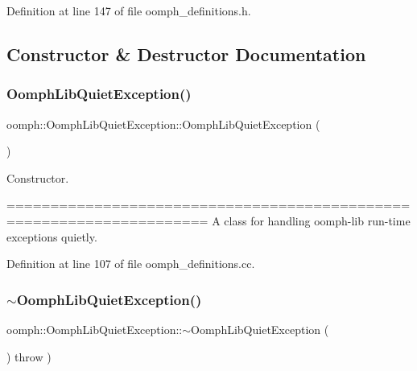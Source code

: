 Definition at line 147 of file oomph\+\_\+definitions.\+h.



\subsection{Constructor \& Destructor Documentation}
\mbox{\label{classoomph_1_1OomphLibQuietException_a2af6960f51a13bea9cf1eb65ab3c6c41}} 
\subsubsection{\texorpdfstring{Oomph\+Lib\+Quiet\+Exception()}{OomphLibQuietException()}}
{\footnotesize\ttfamily oomph\+::\+Oomph\+Lib\+Quiet\+Exception\+::\+Oomph\+Lib\+Quiet\+Exception (\begin{DoxyParamCaption}{ }\end{DoxyParamCaption})}



Constructor. 

===================================================================== A class for handling oomph-\/lib run-\/time exceptions quietly. 

Definition at line 107 of file oomph\+\_\+definitions.\+cc.

\mbox{\label{classoomph_1_1OomphLibQuietException_a23fe40685d9a4268929c037dc63af7b1}} 
\subsubsection{\texorpdfstring{$\sim$\+Oomph\+Lib\+Quiet\+Exception()}{~OomphLibQuietException()}}
{\footnotesize\ttfamily oomph\+::\+Oomph\+Lib\+Quiet\+Exception\+::$\sim$\+Oomph\+Lib\+Quiet\+Exception (\begin{DoxyParamCaption}{ }\end{DoxyParamCaption}) throw  ) \hspace{0.3cm}{\ttfamily [inline]}}



